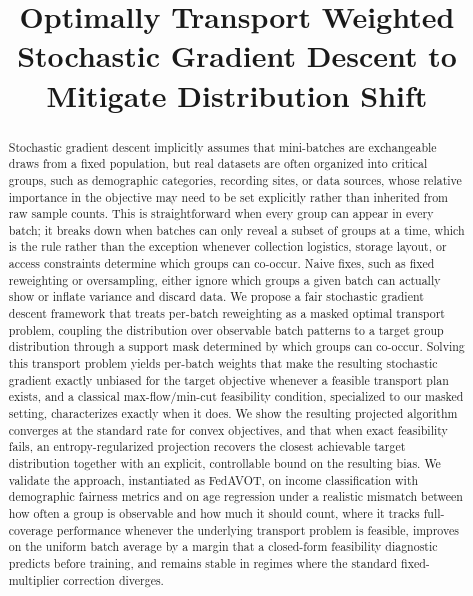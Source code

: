 \documentclass[9pt]{extarticle}
\theoremstyle{definition}
\begin{document}
\title{Optimally Transport Weighted Stochastic Gradient Descent to Mitigate Distribution Shift\vspace{-8pt}}
\maketitle

\begin{abstract}
Stochastic gradient descent implicitly assumes that mini-batches are exchangeable draws from a fixed population, but real datasets are often organized into critical groups, such as demographic categories, recording sites, or data sources, whose relative importance in the objective may need to be set explicitly rather than inherited from raw sample counts. This is straightforward when every group can appear in every batch; it breaks down when batches can only reveal a subset of groups at a time, which is the rule rather than the exception whenever collection logistics, storage layout, or access constraints determine which groups can co-occur. Naive fixes, such as fixed reweighting or oversampling, either ignore which groups a given batch can actually show or inflate variance and discard data. We propose a fair stochastic gradient descent framework that treats per-batch reweighting as a masked optimal transport problem, coupling the distribution over observable batch patterns to a target group distribution through a support mask determined by which groups can co-occur. Solving this transport problem yields per-batch weights that make the resulting stochastic gradient exactly unbiased for the target objective whenever a feasible transport plan exists, and a classical max-flow/min-cut feasibility condition, specialized to our masked setting, characterizes exactly when it does. We show the resulting projected algorithm converges at the standard rate for convex objectives, and that when exact feasibility fails, an entropy-regularized projection recovers the closest achievable target distribution together with an explicit, controllable bound on the resulting bias. We validate the approach, instantiated as FedAVOT, on income classification with demographic fairness metrics and on age regression under a realistic mismatch between how often a group is observable and how much it should count, where it tracks full-coverage performance whenever the underlying transport problem is feasible, improves on the uniform batch average by a margin that a closed-form feasibility diagnostic predicts before training, and remains stable in regimes where the standard fixed-multiplier correction diverges.
\end{abstract}
\end{document}
